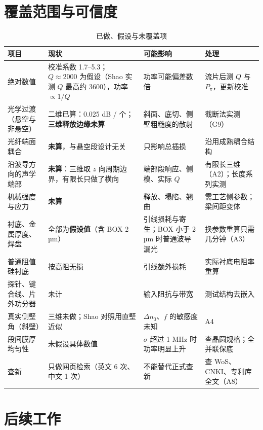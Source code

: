 \documentclass[10pt,a4paper]{article}
\newcommand{\dn}{\Delta n_0}
\begin{document}
\section{覆盖范围与可信度}\label{sec:cov}
\begin{table}[H]
\centering\footnotesize
\caption{已做、假设与未覆盖项}
\begin{tabular}{L{2.3cm}L{4.3cm}L{4.2cm}L{4.0cm}}
\toprule
项目 & 现状 & 可能影响 & 处理 \\
\midrule
绝对数值 & 校准系数 1.7--5.3；$Q\approx2000$ 为假设（Shao 实测 $Q$ 最高约 3600），功率 $\propto 1/Q$ & 功率可能偏差数倍 & 流片后测 $Q$ 与 $P_\pi$，更新校准 \\
光学过渡（悬空与非悬空） & 二维已算：0.025 dB / 个；\textbf{三维释放边缘未算} & 斜面、底切、侧壁粗糙度的散射 & 截断法实测（G9） \\
光纤端面耦合 & \textbf{未算}，与悬空段设计无关 & 只影响总插损 & 沿用成熟耦合结构 \\
沿波导方向的声学端部 & \textbf{未算}：三维取 $z$ 向周期边界，有限长只做了横向 & 端部段响应、侧模、实际 $Q$ & 有限长三维（A2）；长度系列实测 \\
机械强度与应力 & \textbf{未算} & 释放、塌陷、翘曲 & 需工艺侧参数；梁间距变体 \\
衬底、金属厚度、焊盘 & 全部为\textbf{假设值}（含 BOX 2 µm） & 引线损耗与寄生；BOX 小于 2 µm 时普通波导漏光 & 换参数重算只需几分钟（A3） \\
普通阻值硅衬底 & 按高阻无损 & 引线额外损耗 & 实际衬底电阻率重算 \\
探针、键合线、片外功分器 & 未计 & 输入阻抗与带宽 & 测试结构去嵌入 \\
真实侧壁角（斜壁） & 三维未做；Shao 对照用直壁近似 & $\dn$、$f$ 的敏感度未知 & A4 \\
段间膜厚均匀性 & 未假设具体数值 & $\sigma$ 超过 1 MHz 时功率明显上升 & 查晶圆规格；全并联保底 \\
查新 & 只做网页检索（英文 6 次、中文 1 次） & 不能替代正式查新 & 查 WoS、CNKI、专利库全文（A8） \\
\bottomrule
\end{tabular}
\end{table}

\section{后续工作}
\end{document}
